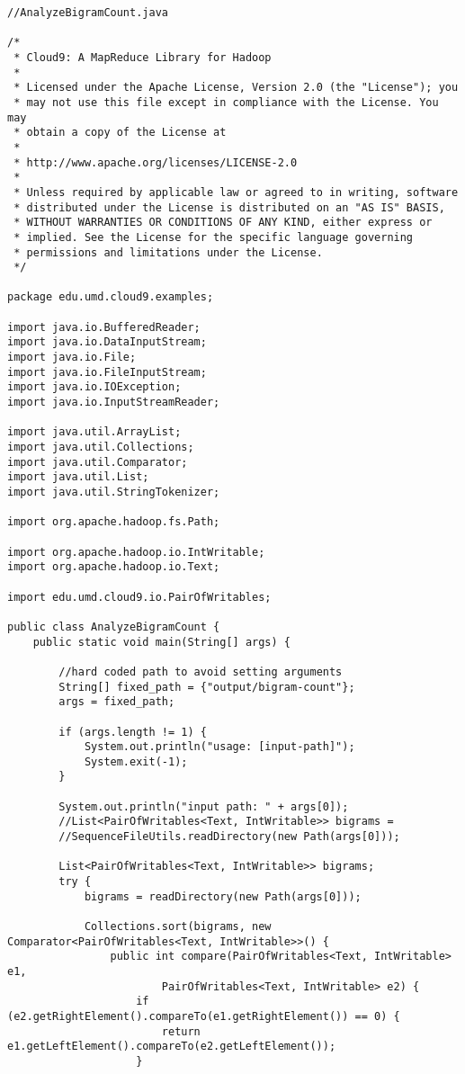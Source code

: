 \documentclass{article} %
\begin{document}
\begin{lstlisting}[style=Java]
//AnalyzeBigramCount.java

/*
 * Cloud9: A MapReduce Library for Hadoop
 * 
 * Licensed under the Apache License, Version 2.0 (the "License"); you
 * may not use this file except in compliance with the License. You may
 * obtain a copy of the License at
 *
 * http://www.apache.org/licenses/LICENSE-2.0 
 *
 * Unless required by applicable law or agreed to in writing, software
 * distributed under the License is distributed on an "AS IS" BASIS,
 * WITHOUT WARRANTIES OR CONDITIONS OF ANY KIND, either express or
 * implied. See the License for the specific language governing
 * permissions and limitations under the License.
 */

package edu.umd.cloud9.examples;

import java.io.BufferedReader;
import java.io.DataInputStream;
import java.io.File;
import java.io.FileInputStream;
import java.io.IOException;
import java.io.InputStreamReader;

import java.util.ArrayList;
import java.util.Collections;
import java.util.Comparator;
import java.util.List;
import java.util.StringTokenizer;

import org.apache.hadoop.fs.Path;

import org.apache.hadoop.io.IntWritable;
import org.apache.hadoop.io.Text;

import edu.umd.cloud9.io.PairOfWritables;

public class AnalyzeBigramCount {
	public static void main(String[] args) {
		
		//hard coded path to avoid setting arguments
		String[] fixed_path = {"output/bigram-count"};
		args = fixed_path;
		
		if (args.length != 1) {
			System.out.println("usage: [input-path]");
			System.exit(-1);
		}

		System.out.println("input path: " + args[0]);
		//List<PairOfWritables<Text, IntWritable>> bigrams =
		//SequenceFileUtils.readDirectory(new Path(args[0]));

		List<PairOfWritables<Text, IntWritable>> bigrams;
		try {
			bigrams = readDirectory(new Path(args[0]));

			Collections.sort(bigrams, new Comparator<PairOfWritables<Text, IntWritable>>() {
				public int compare(PairOfWritables<Text, IntWritable> e1,
						PairOfWritables<Text, IntWritable> e2) {
					if (e2.getRightElement().compareTo(e1.getRightElement()) == 0) {
						return e1.getLeftElement().compareTo(e2.getLeftElement());
					}


\end{lstlisting}
\end{document}
